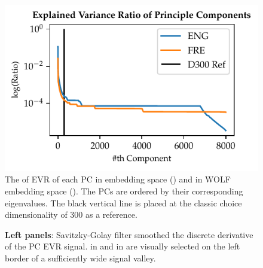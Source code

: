 \begin{figure}
    \centering
    \includegraphics[scale=1]{Figures/SimDimensionSelectionVarRatio.pdf}
    \caption[Explained Variance Ratio of  Embedding Principle Components]{The  of EVR of each PC in  embedding space () and in WOLF embedding space (). The PCs are ordered by their corresponding eigenvalues. The black vertical line is placed at the classic choice dimensionality of 300 as a reference.}
    \label{fig:SimDimensionSeletionVarRatio}
\end{figure}

\begin{figure}
    \centering
    \caption[Smoothed Differentiated EVR of  Embedding PCs]{\textbf{Left panels}: Savitzky-Golay filter smoothed the discrete derivative of the PC EVR signal.  in  and  in  are visually selected on the left border of a sufficiently wide signal valley. }
    \label{fig:SimDimensionSelectionVarRatioDiff}
\end{figure}

